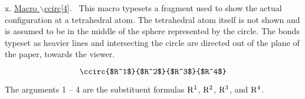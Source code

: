  \vspace{\len mm}
 \indent x. \underline{Macro $\backslash $ccirc[4]}.
 \ This macro typesets a fragment used to show the actual
 configuration at a tetrahedral atom. The tetrahedral atom itself
 is not shown and is assumed to be in the middle of the sphere
 represented by the circle. The bonds typeset as heavier lines
 and intersecting the circle are directed out of the plane of
 the paper, towards the viewer.

 \[ \ccirc{$R^1$}{$R^2$}{$R^3$}{$R^4$}   \]

 The arguments 1 -- 4
 are the substituent formulas ${\rm R^1}$, ${\rm R^2}$,
 ${\rm R^3}$, and ${\rm R^4}$.




 

 
 





